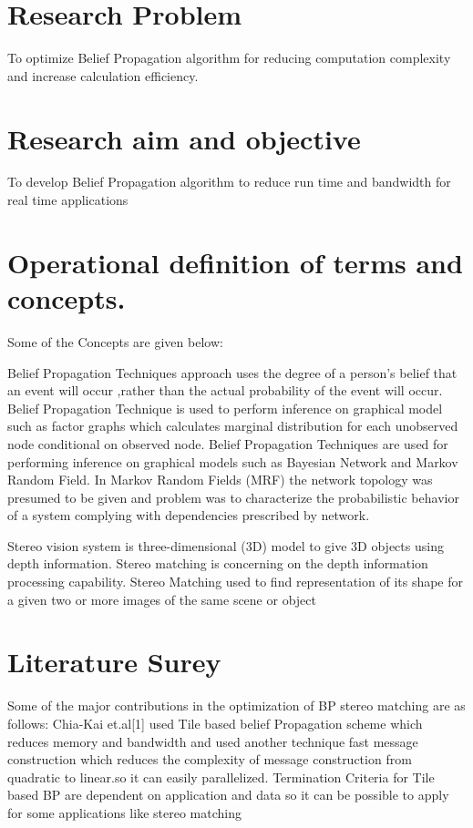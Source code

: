 \section{\textbf{Research Problem}}
To optimize Belief Propagation algorithm  for reducing  computation complexity and increase calculation efficiency.

\section{\textbf{Research aim and objective}}
To develop Belief Propagation algorithm  to reduce run time and bandwidth for real time applications
\section{\textbf{Operational definition of terms and concepts.}}
Some of the Concepts are given  below:

Belief Propagation Techniques approach uses the degree of a person's belief that an event will occur ,rather than the actual probability  of the event will occur.
Belief Propagation Technique is used to perform inference on graphical  model  such as factor graphs which calculates marginal distribution for each unobserved node
conditional on observed node.
Belief Propagation Techniques  are used for performing inference on graphical models such as Bayesian Network and Markov Random Field. In Markov Random  Fields (MRF) the network topology was presumed to be given and problem was to characterize the probabilistic  behavior  of a system complying with dependencies prescribed by network.

Stereo  vision system is three-dimensional (3D) model to give 3D objects using depth information. Stereo matching is concerning on the depth information processing capability. Stereo Matching used to find representation of its shape for a given two or more images of the same scene or object

\section{\textbf{Literature Surey}}
Some of the major contributions in the optimization of BP stereo matching are as follows:
Chia-Kai et.al[1] used Tile based belief Propagation scheme which reduces memory
 and bandwidth and used another technique fast message construction which reduces the complexity of message construction from quadratic to linear.so it can easily parallelized.
Termination Criteria for Tile based BP are dependent on application and data so it can be possible to apply for some applications like stereo matching

